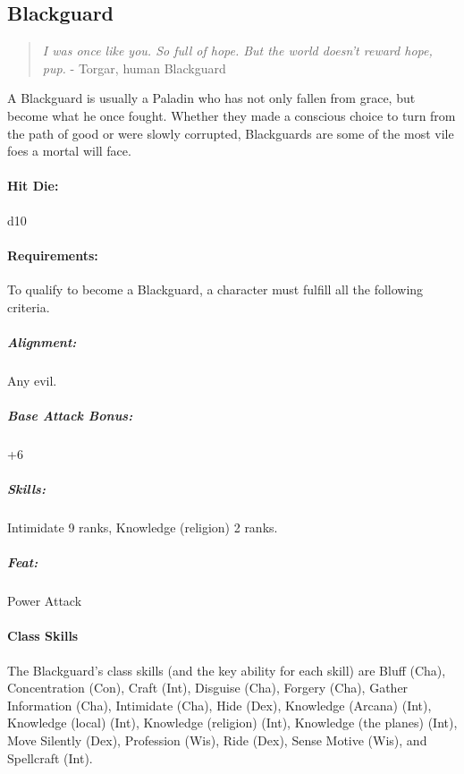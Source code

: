 \subsection{Blackguard}
\begin{quote}
\emph{I was once like you. So full of hope. But the world doesn't reward hope, pup.}
- Torgar, human Blackguard
\end{quote}
A Blackguard is usually a Paladin who has not only fallen from grace, but become what he once fought. Whether they made a conscious choice to turn from the path of good or were slowly corrupted, Blackguards are some of the most vile foes a mortal will face.
\paragraph{Hit Die:} d10
\paragraph{Requirements:}
To qualify to become a Blackguard, a character must fulfill all the following criteria.
\subparagraph{Alignment:} Any evil.
\subparagraph{Base Attack Bonus:} +6
\subparagraph{Skills:} Intimidate 9 ranks, Knowledge (religion) 2 ranks.
\subparagraph{Feat:} Power Attack
\paragraph{Class Skills}
The Blackguard's class skills (and the key ability for each skill) are Bluff (Cha), Concentration (Con), Craft (Int), Disguise (Cha), Forgery (Cha), Gather Information (Cha), Intimidate (Cha), Hide (Dex), Knowledge (Arcana) (Int), Knowledge (local) (Int),
Knowledge (religion) (Int), Knowledge (the planes) (Int), Move Silently (Dex), Profession (Wis), Ride (Dex), Sense Motive (Wis), and Spellcraft (Int).

